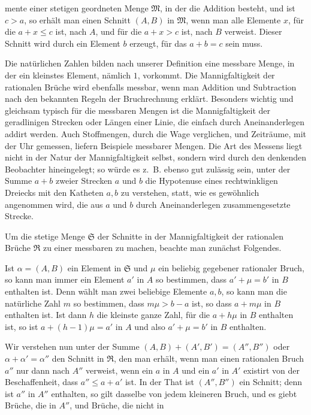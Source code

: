 mente einer stetigen geordneten Menge $\mathfrak M$, in der die
Addition besteht, und ist $c>a$, so erhält man einen Schnitt $(A,B)$
in $\mathfrak M$, wenn man alle Elemente $x$, für die $a+x\le c$ ist,
nach $A$, und für die $a+x>c$ ist, nach $B$ verweist. Dieser Schnitt
wird durch ein Element $b$ erzeugt, für das $a+b=c$ sein muss.

Die natürlichen Zahlen bilden nach unserer Definition eine messbare
Menge, in der ein kleinstes Element, nämlich $1$, vorkommt. Die
Mannigfaltigkeit der rationalen Brüche wird ebenfalls messbar, wenn
man Addition und Subtraction nach den bekannten Regeln der
Bruchrechnung erklärt. Besonders wichtig und gleichsam typisch für die
messbaren Mengen ist die Mannigfaltigkeit der geradlinigen Strecken
oder Längen einer Linie, die einfach durch Aneinanderlegen addirt
werden. Auch Stoffmengen, durch die Wage verglichen, und Zeiträume,
mit der Uhr gemessen, liefern Beispiele messbarer Mengen. Die Art des
Messens liegt nicht in der Natur der Mannigfaltigkeit selbst, sondern
wird durch den denkenden Beobachter hineingelegt; so würde es z.~B.
ebenso gut zulässig sein, unter der Summe $a+b$ zweier Strecken $a$
und $b$ die Hypotenuse eines rechtwinkligen Dreiecks mit den Katheten
$a,b$ zu verstehen, statt, wie es gewöhnlich angenommen wird, die aus
$a$ und $b$ durch Aneinanderlegen zusammengesetzte Strecke.

Um die stetige Menge $\mathfrak S$ der Schnitte in der
Mannigfaltigkeit der rationalen Brüche $\mathfrak R$ zu einer
messbaren zu machen, beachte man zunächst Folgendes.

Ist $\alpha=(A,B)$ ein Element in $\mathfrak S$ und $\mu$ ein beliebig
gegebener rationaler Bruch, so kann man immer ein Element $a'$ in $A$
so bestimmen, dass $a'+\mu=b'$ in $B$ enthalten ist. Denn wählt man
zwei beliebige Elemente $a,b$, so kann man die natürliche Zahl $m$ so
bestimmen, dass $m\mu>b-a$ ist, so dass $a+m\mu$ in $B$ enthalten ist.
Ist dann $h$ die kleinste ganze Zahl, für die $a+h\mu$ in $B$
enthalten ist, so ist $a+(h-1)\mu=a'$ in $A$ und also
$a'+\mu=b'$ in $B$ enthalten.

Wir verstehen nun unter der Summe
$(A,B)+(A',B')=(A'',B'')$ oder $\alpha+\alpha'=\alpha''$ den Schnitt
in $\mathfrak R$, den man erhält, wenn man einen rationalen Bruch
$a''$ nur dann nach $A''$ verweist, wenn ein $a$ in $A$ und ein $a'$
in $A'$ existirt von der Beschaffenheit, dass $a''\le a+a'$ ist. In
der That ist $(A'',B'')$ ein Schnitt; denn ist $a''$ in $A''$
enthalten, so gilt dasselbe von jedem kleineren Bruch, und es giebt
Brüche, die in $A''$, und Brüche, die nicht in
